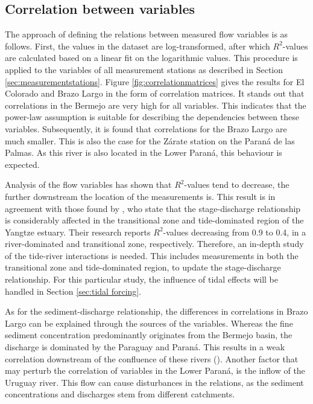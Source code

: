 \subsection{Correlation between variables}
\label{sec:correlation of variables}
The approach of defining the relations between measured flow variables is as follows. First, the values in the dataset are log-transformed, after which $R^2$-values are calculated based on a linear fit on the logarithmic values. This procedure is applied to the variables of all measurement stations as described in Section \ref{sec:measurementstations}. Figure \ref{fig:correlationmatrices} gives the results for El Colorado and Brazo Largo in the form of correlation matrices. It stands out that correlations in the Bermejo are very high for all variables. This indicates that the power-law assumption is suitable for describing the dependencies between these variables. Subsequently, it is found that correlations for the Brazo Largo are much smaller. This is also the case for the Zárate station on the Paraná de las Palmas. As this river is also located in the Lower Paraná, this behaviour is expected. 

Analysis of the flow variables has shown that $R^2$-values tend to decrease, the further downstream the location of the measurements is. This result is in agreement with those found by \citeauthor{songEvaluatingUnderstandingTideriver2024}, who state that the stage-discharge relationship is considerably affected in the transitional zone and tide-dominated region of the Yangtze estuary. Their research reports $R^2$-values decreasing from 0.9 to 0.4, in a river-dominated and transitional zone, respectively. Therefore, an in-depth study of the tide-river interactions is needed. This includes measurements in both the transitional zone and tide-dominated region, to update the stage-discharge relationship. For this particular study, the influence of tidal effects will be handled in Section \ref{sec:tidal forcing}.

As for the sediment-discharge relationship, the differences in correlations in Brazo Largo can be explained through the sources of the variables. Whereas the fine sediment concentration predominantly originates from the Bermejo basin, the discharge is dominated by the Paraguay and Paraná. This results in a weak correlation downstream of the confluence of these rivers (\cite{lopezweibelSourcesTemporalDynamics2022}). Another factor that may perturb the correlation of variables in the Lower Paraná, is the inflow of the Uruguay river. This flow can cause disturbances in the relations, as the sediment concentrations and discharges stem from different catchments. 





